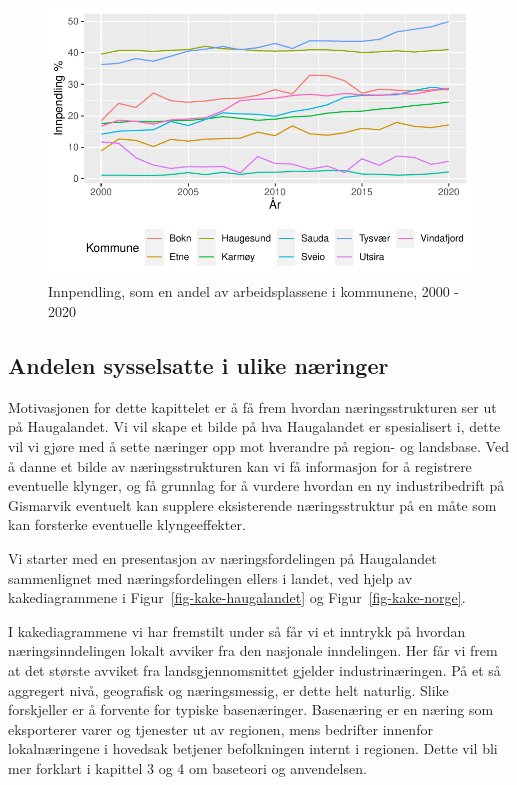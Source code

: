 \documentclass[
]{article}
\begin{document}
\begin{figure}[H]

{\centering \includegraphics{Masteroppgave_files/figure-pdf/fig-innpendling-1.pdf}

}

\caption{\label{fig-innpendling}Innpendling, som en andel av
arbeidsplassene i kommunene, 2000 - 2020}

\end{figure}

\hypertarget{andelen-sysselsatte-i-ulike-nuxe6ringer}{%
\subsection{Andelen sysselsatte i ulike
næringer}\label{andelen-sysselsatte-i-ulike-nuxe6ringer}}

Motivasjonen for dette kapittelet er å få frem hvordan næringsstrukturen
ser ut på Haugalandet. Vi vil skape et bilde på hva Haugalandet er
spesialisert i, dette vil vi gjøre med å sette næringer opp mot
hverandre på region- og landsbase. Ved å danne et bilde av
næringsstrukturen kan vi få informasjon for å registrere eventuelle
klynger, og få grunnlag for å vurdere hvordan en ny industribedrift på
Gismarvik eventuelt kan supplere eksisterende næringsstruktur på en måte
som kan forsterke eventuelle klyngeeffekter.

Vi starter med en presentasjon av næringsfordelingen på Haugalandet
sammenlignet med næringsfordelingen ellers i landet, ved hjelp av
kakediagrammene i Figur~\ref{fig-kake-haugalandet} og
Figur~\ref{fig-kake-norge}.

I kakediagrammene vi har fremstilt under så får vi et inntrykk på
hvordan næringsinndelingen lokalt avviker fra den nasjonale inndelingen.
Her får vi frem at det største avviket fra landsgjennomsnittet gjelder
industrinæringen. På et så aggregert nivå, geografisk og næringsmessig,
er dette helt naturlig. Slike forskjeller er å forvente for typiske
basenæringer. Basenæring er en næring som eksporterer varer og tjenester
ut av regionen, mens bedrifter innenfor lokalnæringene i hovedsak
betjener befolkningen internt i regionen. Dette vil bli mer forklart i
kapittel 3 og 4 om baseteori og anvendelsen.
\end{document}

